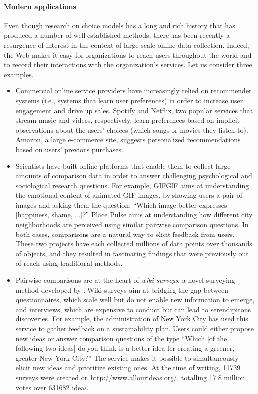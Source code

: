 \paragraph{Modern applications}
Even though research on choice models has a long and rich history that has produced a number of well-established methods, there has been recently a resurgence of interest in the context of large-scale online data collection.
Indeed, the Web makes it easy for organizations to reach users throughout the world and to record their interactions with the organization's services.
Let us consider three examples.
\begin{itemize}
\item Commercial online service providers have increasingly relied on recommender systems (i.e., systems that learn user preferences) in order to increase user engagement and drive up sales.
Spotify and Netflix, two popular services that stream music and videos, respectively, learn preferences based on implicit observations about the users' choices (which songs or movies they listen to).
Amazon, a large e-commerce site, suggests personalized recommendations based on users' previous purchases.

\item Scientists have built online platforms that enable them to collect large amounts of comparison data in order to answer challenging psychological and sociological research questions.
For example, GIFGIF aims at understanding the emotional content of animated GIF images, by showing users a pair of images and asking them the question: ``Which image better expresses [happiness, shame, ...]?''
Place Pulse aims at understanding how different city neighborhoods are perceived using similar pairwise comparison questions.
In both cases, comparisons are a natural way to elicit feedback from users.
These two projects have each collected millions of data points over thousands of objects, and they resulted in fascinating findings that were previously out of reach using traditional methods. 

\item Pairwise comparisons are at the heart of \emph{wiki surveys}, a novel surveying method developed by \citet{salganik2015wiki}.
Wiki surveys aim at bridging the gap between questionnaires, which scale well but do not enable new information to emerge, and interviews, which are expensive to conduct but can lead to serendipitous discoveries.
For example, the administration of New York City has used this service to gather feedback on a sustainability plan.
Users could either propose new ideas or answer comparison questions of the type ``Which [of the following two ideas] do you think is a better idea for creating a greener, greater New York City?''
The service makes it possible to simultaneously elicit new ideas and prioritize existing ones.
At the time of writing, \num{11739} surveys were created on \url{http://www.allourideas.org/}, totalling \num{17.8} million votes over \num{631682} ideas.
\end{itemize}

